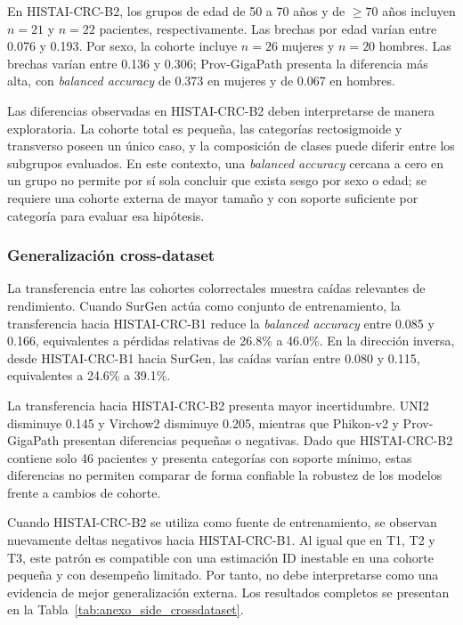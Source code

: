 En HISTAI-CRC-B2, los grupos de edad de 50 a 70 años y de $\geq 70$ años incluyen $n=21$ y $n=22$ pacientes, respectivamente. Las brechas por edad varían entre 0.076 y 0.193. Por sexo, la cohorte incluye $n=26$ mujeres y $n=20$ hombres. Las brechas varían entre 0.136 y 0.306; Prov-GigaPath presenta la diferencia más alta, con \textit{balanced accuracy} de 0.373 en mujeres y de 0.067 en hombres.

Las diferencias observadas en HISTAI-CRC-B2 deben interpretarse de manera exploratoria. La cohorte total es pequeña, las categorías rectosigmoide y transverso poseen un único caso, y la composición de clases puede diferir entre los subgrupos evaluados. En este contexto, una \textit{balanced accuracy} cercana a cero en un grupo no permite por sí sola concluir que exista sesgo por sexo o edad; se requiere una cohorte externa de mayor tamaño y con soporte suficiente por categoría para evaluar esa hipótesis.

\subsubsection{Generalización cross-dataset}

La transferencia entre las cohortes colorrectales muestra caídas relevantes de rendimiento. Cuando SurGen actúa como conjunto de entrenamiento, la transferencia hacia HISTAI-CRC-B1 reduce la \textit{balanced accuracy} entre 0.085 y 0.166, equivalentes a pérdidas relativas de 26.8\% a 46.0\%. En la dirección inversa, desde HISTAI-CRC-B1 hacia SurGen, las caídas varían entre 0.080 y 0.115, equivalentes a 24.6\% a 39.1\%.

La transferencia hacia HISTAI-CRC-B2 presenta mayor incertidumbre. UNI2 disminuye 0.145 y Virchow2 disminuye 0.205, mientras que Phikon-v2 y Prov-GigaPath presentan diferencias pequeñas o negativas. Dado que HISTAI-CRC-B2 contiene solo 46 pacientes y presenta categorías con soporte mínimo, estas diferencias no permiten comparar de forma confiable la robustez de los modelos frente a cambios de cohorte.

Cuando HISTAI-CRC-B2 se utiliza como fuente de entrenamiento, se observan nuevamente deltas negativos hacia HISTAI-CRC-B1. Al igual que en T1, T2 y T3, este patrón es compatible con una estimación ID inestable en una cohorte pequeña y con desempeño limitado. Por tanto, no debe interpretarse como una evidencia de mejor generalización externa. Los resultados completos se presentan en la Tabla~\ref{tab:anexo_side_crossdataset}.

